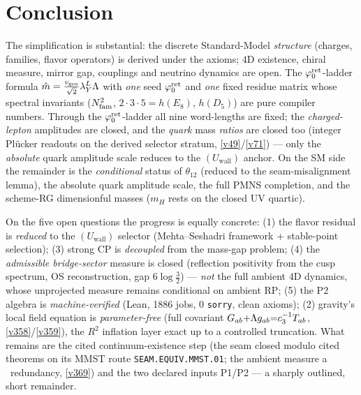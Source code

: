 \section*{Conclusion}
The simplification is substantial: the discrete Standard-Model \emph{structure} (charges, families, flavor operators) is derived under the axioms; $4$D existence, chiral measure, mirror gap, couplings and neutrino dynamics are open.  The $\varphi_0^{\mathrm{ret}}$-ladder formula $\hat m=\tfrac{v_{\mathrm{geo}}}{\sqrt2}\lambda_Y^{L}\Lambda$ with
\emph{one} seed $\varphi_0^{\mathrm{ret}}$ and \emph{one} fixed residue matrix whose spectral invariants
($N_{\mathrm{fam}}^2$, $2{\cdot}3{\cdot}5{=}h(E_8)$, $h(D_5)$) are pure compiler numbers. Through the $\varphi_0^{\mathrm{ret}}$-ladder all
nine word-lengths are fixed; the \emph{charged-lepton} amplitudes are closed, and the \emph{quark} mass
\emph{ratios} are closed too (integer Plücker readouts on the derived selector stratum, \vref{v49}/\vref{v71}) --- only the
\emph{absolute} quark amplitude scale reduces to the $(U_{\mathrm{wall}})$ anchor. On
the SM side the remainder is the \emph{conditional} status of $\theta_{12}$ (reduced to the
seam-misalignment lemma), the absolute quark amplitude scale, the full PMNS completion, and the scheme-RG
dimensionful masses ($m_H$ rests on the closed UV quartic).

On the five open questions the progress is equally concrete: (1) the flavor residual is \emph{reduced} to
the $(U_{\mathrm{wall}})$ selector (Mehta--Seshadri framework $+$ stable-point selection); (3) strong CP is
\emph{decoupled} from the mass-gap problem; (4) the \emph{admissible
bridge-sector} measure is closed (reflection positivity from the cusp spectrum, OS reconstruction, gap
$6\log\tfrac32$) --- \emph{not} the full ambient $4$D dynamics, whose unprojected measure remains
conditional on ambient RP; (5) the P2 algebra is \emph{machine-verified} (Lean, 1886 jobs, 0
\texttt{sorry}, clean axioms); (2) gravity's local field equation is \emph{parameter-free} (full covariant
$G_{ab}{+}\Lambda g_{ab}{=}c_3^{-1}T_{ab}$, \vref{v358}/\vref{v359}), the $R^2$ inflation layer exact up to
a controlled truncation. What remains are the cited continuum-existence step (the seam closed modulo cited
theorems on its MMST route \texttt{SEAM.EQUIV.MMST.01}; the ambient measure a \mC\ redundancy, \vref{v369}) and the two declared inputs P1/P2 --- a
sharply outlined, short remainder.

